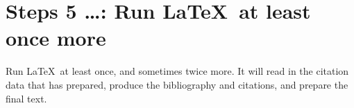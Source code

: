 \section{Steps 5 \ldots: Run \LaTeX\ at least once more}

Run \LaTeX\ at least once, and sometimes twice more. It will read in
the citation data that  has prepared, produce the
bibliography and citations, and prepare the final text.



